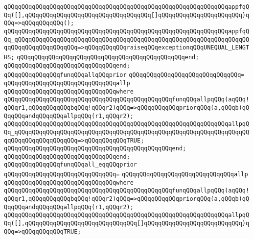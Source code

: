\verb|qQQqqQQqqQQqqQQqqQQqqQQqqQQqqQQqqQQqqQQqqQQqqQQqqQQqqQQqqQQqqQQqappfqQQq([],qQQqqQQqqQQqqQQqqQQqqQQqqQQqqQQqqQQq[]qQQqqQQqqQQqqQQqqQQqqQQq)qQQq=>qQQqqQQqqQQq();|\newline
\verb|qQQqqQQqqQQqqQQqqQQqqQQqqQQqqQQqqQQqqQQqqQQqqQQqqQQqqQQqqQQqqQQqappfqQQq_qQQqqQQqqQQqqQQqqQQqqQQqqQQqqQQqqQQqqQQqqQQqqQQqqQQqqQQqqQQqqQQqqQQqqQQqqQQqqQQqqQQqqQQq=>qQQqqQQqqQQqraiseqQQqexceptionqQQqUNEQUAL_LENGTHS;|\newline
\verb|qQQqqQQqqQQqqQQqqQQqqQQqqQQqqQQqqQQqqQQqqQQqqQQqend;|\newline
\verb|qQQqqQQqqQQqqQQqqQQqqQQqqQQqqQQqend;|\newline
\newline
\verb|qQQqqQQqqQQqqQQqfunqQQqallqQQqprior|\newline
\verb|qQQqqQQqqQQqqQQqqQQqqQQqqQQqqQQq=|\newline
\verb|qQQqqQQqqQQqqQQqqQQqqQQqqQQqqQQqallp|\newline
\verb|qQQqqQQqqQQqqQQqqQQqqQQqqQQqqQQqwhere|\newline
\verb|qQQqqQQqqQQqqQQqqQQqqQQqqQQqqQQqqQQqqQQqqQQqqQQqfunqQQqallpqQQq(aqQQq!qQQqr1,qQQqqQQqqQQqbqQQq!qQQqr2)qQQq=>qQQqqQQqqQQqpriorqQQq(a,qQQqb)qQQqqQQqandqQQqqQQqallpqQQq(r1,qQQqr2);|\newline
\verb|qQQqqQQqqQQqqQQqqQQqqQQqqQQqqQQqqQQqqQQqqQQqqQQqqQQqqQQqqQQqqQQqallpqQQq_qQQqqQQqqQQqqQQqqQQqqQQqqQQqqQQqqQQqqQQqqQQqqQQqqQQqqQQqqQQqqQQqqQQqqQQqqQQqqQQqqQQqqQQq=>qQQqqQQqqQQqTRUE;|\newline
\verb|qQQqqQQqqQQqqQQqqQQqqQQqqQQqqQQqqQQqqQQqqQQqqQQqend;|\newline
\verb|qQQqqQQqqQQqqQQqqQQqqQQqqQQqqQQqend;|\newline
\newline
\verb|qQQqqQQqqQQqqQQqfunqQQqall_eqqQQqprior|\newline
\verb|qQQqqQQqqQQqqQQqqQQqqQQqqQQqqQQq=|\newline
\verb|qQQqqQQqqQQqqQQqqQQqqQQqqQQqqQQqallp|\newline
\verb|qQQqqQQqqQQqqQQqqQQqqQQqqQQqqQQqwhere|\newline
\verb|qQQqqQQqqQQqqQQqqQQqqQQqqQQqqQQqqQQqqQQqqQQqqQQqfunqQQqallpqQQq(aqQQq!qQQqr1,qQQqqQQqqQQqbqQQq!qQQqr2)qQQq=>qQQqqQQqqQQqpriorqQQq(a,qQQqb)qQQqqQQqandqQQqqQQqallpqQQq(r1,qQQqr2);|\newline
\verb|qQQqqQQqqQQqqQQqqQQqqQQqqQQqqQQqqQQqqQQqqQQqqQQqqQQqqQQqqQQqqQQqallpqQQq([],qQQqqQQqqQQqqQQqqQQqqQQqqQQqqQQq[]qQQqqQQqqQQqqQQqqQQqqQQqqQQq)qQQq=>qQQqqQQqqQQqTRUE;|\newline
